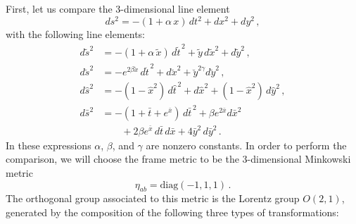 \documentclass[twocolumn,prd,aps,showpacs,showkeys,amsmath,amssymb]{revtex4-1}
\begin{document}
First, let us compare the 3-dimensional line element
\begin{equation}\label{3D0}
  ds^2 = -(1+ \alpha\,x)\,dt^2 + dx^2 + dy^2 \,,
\end{equation}
with the following line elements:
\begin{align}
   d\tilde{s}^2 &= -(1+ \alpha\,\tilde{x})\,d\tilde{t}^{\,2}  + \tilde{y}\,d\tilde{x}^2 + d\tilde{y}^2 \,, \label{3D1} \\
   d\breve{s}^2 &= -e^{2\beta \breve{x}}\,d\breve{t}^{\,2} + d\breve{x}^2 + \breve{y}^{2\gamma} d\breve{y}^2 \,,\label{3D4} \\
 d\hat{s}^2 &= -(1 -  \hat{x}^2)\,d\hat{t}^{\,2}  + d\hat{x}^2 + (1 - \hat{x}^2)\,d\hat{y}^2 \,,\label{3D2} \\
 d\bar{s}^2 &= -\left( 1+ \bar{t} + e^{\bar{x}}\right) \,d\bar{t}^{\,2}  + \beta e^{2\bar{x}}d\bar{x}^2  \label{3D3}\\
 & \quad\quad  + 2\beta  e^{\bar{x}}\,d\bar{t} \, d\bar{x} + 4 \bar{y}^2\, d\bar{y}^2 \,.  \nonumber
\end{align}
In these expressions $\alpha$, $\beta$, and $\gamma$ are nonzero constants. In order to perform the comparison, we will choose the frame metric to be the 3-dimensional Minkowski metric
$$ \eta_{ab} = \textrm{diag}(-1,1,1) \,. $$
The orthogonal group associated to this metric is the Lorentz group $O(2,1)$, generated by the composition of the following three types of transformations:
\end{document}

